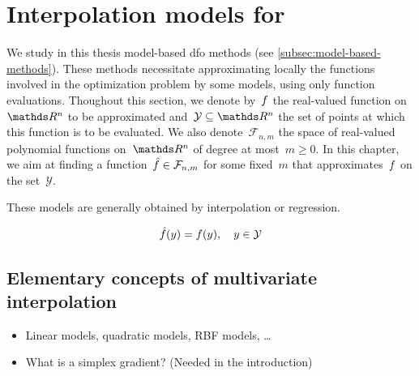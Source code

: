 %
%
%
\chapter{Interpolation models for }

We study in this thesis model-based \gls{dfo} methods (see \cref{subsec:model-based-methods}).
These methods necessitate approximating locally the functions involved in the optimization problem by some models, using only function evaluations.
Thoughout this section, we denote by~$f$ the real-valued function on~$\R^n$ to be approximated and~$\mathcal{Y} \subseteq \R^n$ the set of points at which this function is to be evaluated.
We also denote~$\mathcal{F}_{n, m}$ the space of real-valued polynomial functions on~$\R^n$ of degree at most~$m \ge 0$.
In this chapter, we aim at finding a function~$\hat{f} \in \mathcal{F}_{n, m}$ for some fixed~$m$ that approximates~$f$ on the set~$\mathcal{Y}$.

These models are generally obtained by interpolation or regression.

\begin{equation*}
    \hat{f}(y) = f(y), \quad y \in \mathcal{Y}
\end{equation*}

\section{Elementary concepts of multivariate interpolation}
\label{sec:multivariate-interpolation}

\begin{itemize}
    \item Linear models, quadratic models, RBF models, \dots
    \item What is a simplex gradient? (Needed in the introduction)
\end{itemize}


